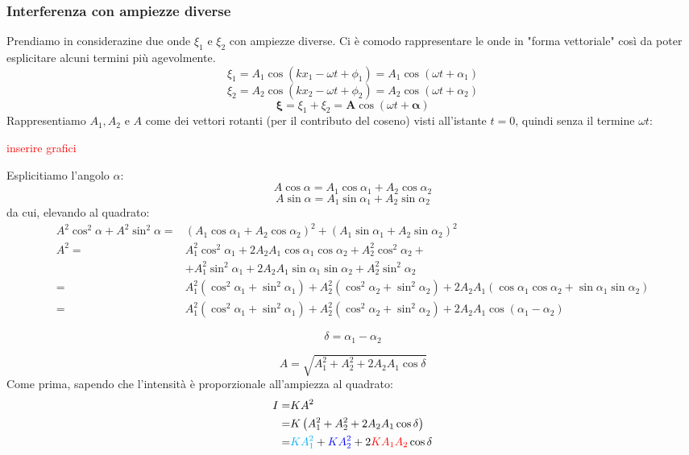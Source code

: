 \documentclass[x11names]{article}
\begin{document}
		\subsubsection{Interferenza con ampiezze diverse}
		Prendiamo in considerazine due onde \(\xi_1\) e \(\xi_2\) con ampiezze diverse. Ci è comodo rappresentare le onde in "forma vettoriale" così da poter esplicitare alcuni termini più agevolmente.
		\[ 
		\xi_1 = A_1 \cos\left(kx_1 - \omega t + \phi_1\right) = A_1 \cos\left(\omega t + \alpha_1\right)
		\]
		\[ 
		\xi_2 = A_2 \cos\left(kx_2 - \omega t + \phi_2\right) = A_2 \cos\left(\omega t + \alpha_2\right)
		\]
		\[ 
		\boldsymbol{\xi} = \xi _1 + \xi _2 = \boldsymbol{A}\cos\left(\omega t + \boldsymbol{\alpha}\right)
		\]
		Rappresentiamo \(A_1,A_2\) e \(A\) come dei vettori rotanti (per il contributo del coseno) visti all'istante \(t=0\), quindi senza il termine \(\omega t\):
		
		\begin{center}
			\textcolor{red}{inserire grafici}
		\end{center}
		
		Esplicitiamo l'angolo \(\alpha\):
		\[ 
		A\cos\alpha = A_1\cos\alpha_1 + A_2\cos\alpha_2		
		\]
		\[ 
		A\sin\alpha = A_1\sin\alpha_1 + A_2\sin\alpha_2		
		\]
		da cui, elevando al quadrato:
		\begin{align*} 
		A^2\cos^2\alpha + A^2\sin^2\alpha =& (A_1\cos\alpha_1 + A_2\cos\alpha_2)^2 + (A_1\sin\alpha_1 + A_2\sin\alpha_2)^2\\
									 A^2 =& A_1^2\cos^2\alpha_1 + 2A_2A_1\cos\alpha_1\cos\alpha_2 + A_2^2\cos^2\alpha_2 + \\ &+ A_1^2\sin^2\alpha_1 + 2A_2A_1\sin\alpha_1\sin\alpha_2 + A_2^2\sin^2\alpha_2\\
									     =& A_1^2(\cos^2\alpha_1 + \sin^2\alpha_1) + A_2^2(\cos^2\alpha_2 + \sin^2\alpha_2) + 2A_2A_1(\cos\alpha_1\cos\alpha_2 + \sin\alpha_1\sin\alpha_2)\\
									     =&  A_1^2(\cos^2\alpha_1 + \sin^2\alpha_1) + A_2^2(\cos^2\alpha_2 + \sin^2\alpha_2) +  2A_2A_1\cos\left(\alpha_1 - \alpha_2\right)
		\end{align*} 
		
		\[ 
		\boxed{\delta = \alpha_1 - \alpha_2}
		\]
		
		\begin{equation}
			A = \sqrt{A_1^2 + A_2^2 + 2A_2A_1\cos\delta}
		\end{equation}
		Come prima, sapendo che l'intensità è proporzionale all'ampiezza al quadrato:
		\begin{align*}
		I =& KA^2 \\ 
		  =& K\left(A_1^2 + A_2^2 + 2A_2A_1\cos\delta\right)\\
		  =& \textcolor{cyan}{KA_1^2} + \textcolor{blue}{KA_2^2} + 2\textcolor{red}{KA_1A_2}\cos\delta
		\end{align*}
		
\end{document}
